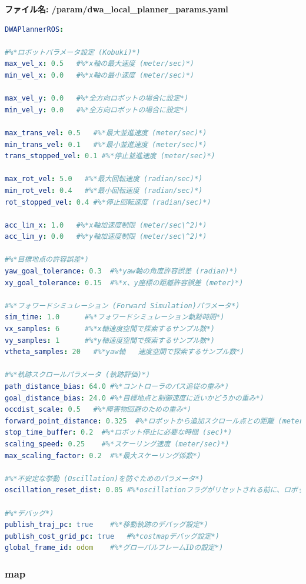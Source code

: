 \textbf{ファイル名: /param/dwa\_local\_planner\_params.yaml}
\begin{lstlisting}[language=YAML]
DWAPlannerROS:

#%*ロボットパラメータ設定 (Kobuki)*)
max_vel_x: 0.5   #%*x軸の最大速度 (meter/sec)*)
min_vel_x: 0.0   #%*x軸の最小速度 (meter/sec)*)

max_vel_y: 0.0   #%*全方向ロボットの場合に設定*)
min_vel_y: 0.0   #%*全方向ロボットの場合に設定*)

max_trans_vel: 0.5   #%*最大並進速度 (meter/sec)*)
min_trans_vel: 0.1   #%*最小並進速度 (meter/sec)*)
trans_stopped_vel: 0.1 #%*停止並進速度 (meter/sec)*)

max_rot_vel: 5.0   #%*最大回転速度 (radian/sec)*)
min_rot_vel: 0.4   #%*最小回転速度 (radian/sec)*)
rot_stopped_vel: 0.4 #%*停止回転速度 (radian/sec)*)

acc_lim_x: 1.0   #%*x軸加速度制限 (meter/sec\^2)*)
acc_lim_y: 0.0   #%*y軸加速度制限 (meter/sec\^2)*)

#%*目標地点の許容誤差*)
yaw_goal_tolerance: 0.3  #%*yaw軸の角度許容誤差 (radian)*)
xy_goal_tolerance: 0.15  #%*x、y座標の距離許容誤差 (meter)*)

#%*フォワードシミュレーション (Forward Simulation)パラメータ*)
sim_time: 1.0      #%*フォワードシミュレーション軌跡時間*)
vx_samples: 6      #%*x軸速度空間で探索するサンプル数*)
vy_samples: 1      #%*y軸速度空間で探索するサンプル数*)
vtheta_samples: 20   #%*yaw軸   速度空間で探索するサンプル数*)

#%*軌跡スクロールパラメータ (軌跡評価)*)
path_distance_bias: 64.0 #%*コントローラのパス追従の重み*)
goal_distance_bias: 24.0 #%*目標地点と制御速度に近いかどうかの重み*)
occdist_scale: 0.5   #%*障害物回避のための重み*)
forward_point_distance: 0.325  #%*ロボットから追加スクロール点との距離 (meter)*)
stop_time_buffer: 0.2  #%*ロボット停止に必要な時間 (sec)*)
scaling_speed: 0.25    #%*スケーリング速度 (meter/sec)*)
max_scaling_factor: 0.2  #%*最大スケーリング係数*)

#%*不安定な挙動 (Oscillation)を防ぐためのパラメータ*)
oscillation_reset_dist: 0.05 #%*oscillationフラグがリセットされる前に、ロボットがどのように移動するかの設定*)

#%*デバッグ*)
publish_traj_pc: true    #%*移動軌跡のデバッグ設定*)
publish_cost_grid_pc: true   #%*costmapデバッグ設定*)
global_frame_id: odom    #%*グローバルフレームIDの設定*)
\end{lstlisting}

\subsubsection{map}


